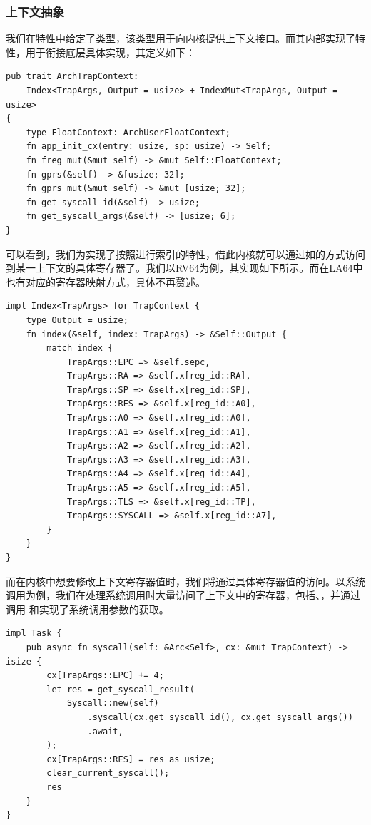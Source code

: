 \documentclass{article}
\begin{document}
\subsubsection{上下文抽象}

我们在特性中给定了类型，该类型用于向内核提供上下文接口。而其内部实现了特性，用于衔接底层具体实现，其定义如下：

\begin{lstlisting}
pub trait ArchTrapContext:
    Index<TrapArgs, Output = usize> + IndexMut<TrapArgs, Output = usize>
{
    type FloatContext: ArchUserFloatContext;
    fn app_init_cx(entry: usize, sp: usize) -> Self;
    fn freg_mut(&mut self) -> &mut Self::FloatContext;
    fn gprs(&self) -> &[usize; 32];
    fn gprs_mut(&mut self) -> &mut [usize; 32];
    fn get_syscall_id(&self) -> usize;
    fn get_syscall_args(&self) -> [usize; 6];
}
\end{lstlisting}

可以看到，我们为实现了按照进行索引的特性，借此内核就可以通过如的方式访问到某一上下文的具体寄存器了。我们以RV64为例，其实现如下所示。而在LA64中也有对应的寄存器映射方式，具体不再赘述。

\begin{lstlisting}
impl Index<TrapArgs> for TrapContext {
    type Output = usize;
    fn index(&self, index: TrapArgs) -> &Self::Output {
        match index {
            TrapArgs::EPC => &self.sepc,
            TrapArgs::RA => &self.x[reg_id::RA],
            TrapArgs::SP => &self.x[reg_id::SP],
            TrapArgs::RES => &self.x[reg_id::A0],
            TrapArgs::A0 => &self.x[reg_id::A0],
            TrapArgs::A1 => &self.x[reg_id::A1],
            TrapArgs::A2 => &self.x[reg_id::A2],
            TrapArgs::A3 => &self.x[reg_id::A3],
            TrapArgs::A4 => &self.x[reg_id::A4],
            TrapArgs::A5 => &self.x[reg_id::A5],
            TrapArgs::TLS => &self.x[reg_id::TP],
            TrapArgs::SYSCALL => &self.x[reg_id::A7],
        }
    }
}
\end{lstlisting}

而在内核中想要修改上下文寄存器值时，我们将通过具体寄存器值的访问。以系统调用为例，我们在处理系统调用时大量访问了上下文中的寄存器，包括、，并通过调用 和实现了系统调用参数的获取。

\begin{lstlisting}
impl Task {
    pub async fn syscall(self: &Arc<Self>, cx: &mut TrapContext) -> isize {
        cx[TrapArgs::EPC] += 4;
        let res = get_syscall_result(
            Syscall::new(self)
                .syscall(cx.get_syscall_id(), cx.get_syscall_args())
                .await,
        );
        cx[TrapArgs::RES] = res as usize;
        clear_current_syscall();
        res
    }
}
\end{lstlisting}
\end{document}
